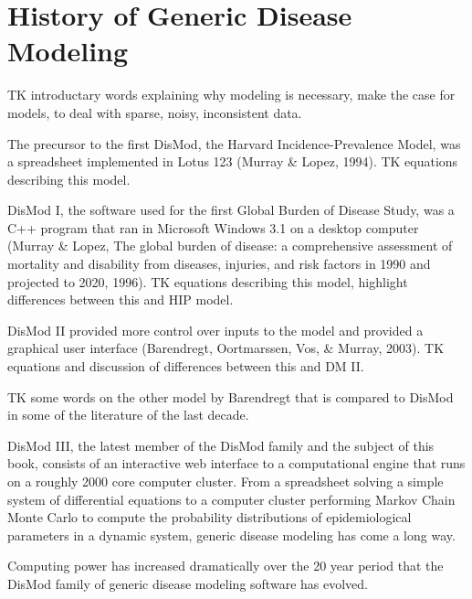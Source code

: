 \section{History of Generic Disease Modeling}
TK introductary words explaining why modeling is necessary, make the
case for models, to deal with sparse, noisy, inconsistent data.

The precursor to the first DisMod, the Harvard
Incidence-Prevalence Model, was a spreadsheet implemented in Lotus 123
(Murray \& Lopez, 1994). TK equations describing this model.

DisMod I, the software used for the first
Global Burden of Disease Study, was a C++ program that ran in
Microsoft Windows 3.1 on a desktop computer (Murray \& Lopez, The
global burden of disease: a comprehensive assessment of mortality and
disability from diseases, injuries, and risk factors in 1990 and
projected to 2020, 1996). TK equations describing this model, highlight differences between this and HIP model.

DisMod II provided more control over inputs
to the model and provided a graphical user interface (Barendregt,
Oortmarssen, Vos, \& Murray, 2003). TK equations and discussion of differences between this and DM II.

TK some words on the other model by Barendregt that is compared to DisMod in some of the literature of the last decade.

DisMod III, the latest member of
the DisMod family and the subject of this book, consists of an
interactive web interface to a computational engine that runs on a
roughly 2000 core computer cluster. From a spreadsheet solving a
simple system of differential equations to a computer cluster
performing Markov Chain Monte Carlo to compute the probability
distributions of epidemiological parameters in a dynamic system,
generic disease modeling has come a long way.

Computing power has increased dramatically over the 20 year period
that the DisMod family of generic disease modeling software has
evolved. 


